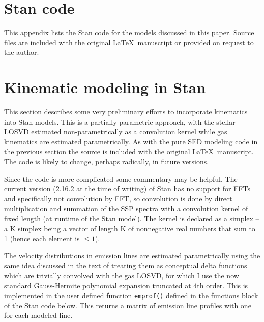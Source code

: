 \documentclass[modern]{aastex62}
\begin{document}
\appendix
\section{Stan code}
\label{sec:code}

This appendix lists the Stan code for the models discussed in this paper. Source files are included with the original \LaTeX~manuscript or provided on request to the author.



\section{Kinematic modeling in Stan}
\label{sec:kinstan}

This section describes some very preliminary efforts to incorporate kinematics into Stan models. This is a partially parametric approach, with the stellar LOSVD estimated non-parametrically as a convolution kernel while gas kinematics are estimated parametrically. As with the pure SED modeling code in the previous section the source is included with the original \LaTeX~manuscript. The code is likely to change, perhaps radically, in future versions.

Since the code is more complicated some commentary may be helpful. The current version (2.16.2 at the time of writing) of Stan has no support for FFTs and specifically not convolution by FFT, so convolution is done by direct multiplication and summation of the SSP spectra with a convolution kernel of fixed length (at runtime of the Stan model). The kernel is declared as a simplex -- a K simplex being a vector of length K of nonnegative real numbers that sum to 1 (hence each element is $\le 1$).

The velocity distributions in emission lines are estimated parametrically using the same idea discussed in the text of treating them as conceptual delta functions which are trivially convolved with the gas LOSVD, for which I use the now standard Gauss-Hermite polynomial expansion \citep{1993ApJ...407..525V, 2004PASP..116..138C, 2017MNRAS.466..798C} truncated at 4th order. This is implemented in the user defined function \texttt{emprof()} defined in the functions block of the Stan code below. This returns a matrix of emission line profiles with one for each modeled line.
\end{document}
